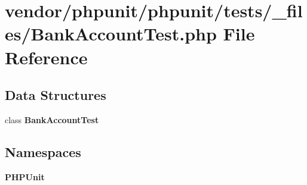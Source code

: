 \section{vendor/phpunit/phpunit/tests/\+\_\+files/\+Bank\+Account\+Test.php File Reference}
\label{phpunit_2tests_2__files_2_bank_account_test_8php}
\subsection*{Data Structures}
\begin{DoxyCompactItemize}
\item 
class {\bf Bank\+Account\+Test}
\end{DoxyCompactItemize}
\subsection*{Namespaces}
\begin{DoxyCompactItemize}
\item 
 {\bf P\+H\+P\+Unit}
\end{DoxyCompactItemize}
